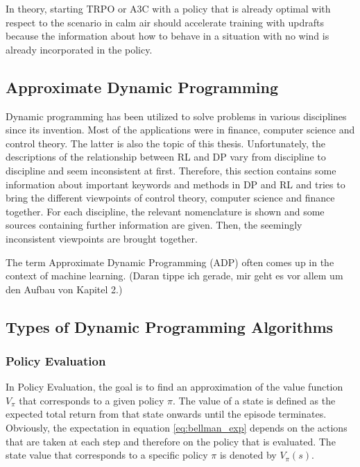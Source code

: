 In theory, starting TRPO or A3C with a policy that is already optimal with respect to the scenario in calm air should accelerate training with updrafts because the information about how to behave in a situation with no wind is already incorporated in the policy.

\subsection{Approximate Dynamic Programming}

Dynamic programming has been utilized to solve problems in various disciplines since its invention. Most of the applications were in finance, computer science and control theory. The latter is also the topic of this thesis. Unfortunately, the descriptions of the relationship between RL and DP vary from discipline to discipline and seem inconsistent at first. Therefore, this section contains some information about important keywords and methods in DP and RL and tries to bring the different viewpoints of control theory, computer science and finance together. For each discipline, the relevant nomenclature is shown and some sources containing further information are given. Then, the seemingly inconsistent viewpoints are brought together.

The term Approximate Dynamic Programming (ADP)  often comes up in the context of machine learning. (Daran tippe ich gerade, mir geht es vor allem um den Aufbau von Kapitel 2.)

\subsection{Types of Dynamic Programming Algorithms}

\subsubsection{Policy Evaluation}
\label{subsection:policy_evaluation}

In Policy Evaluation, the goal is to find an approximation of the value function $V_\pi$ that corresponds to a given policy $\pi$. The value of a state is defined as the expected total return from that state onwards until the episode terminates. Obviously, the expectation in equation \ref{eq:bellman_exp} depends on the actions that are taken at each step and therefore on the policy that is evaluated. The state value that corresponds to a specific policy $\pi$ is denoted by $V_\pi(s)$.


